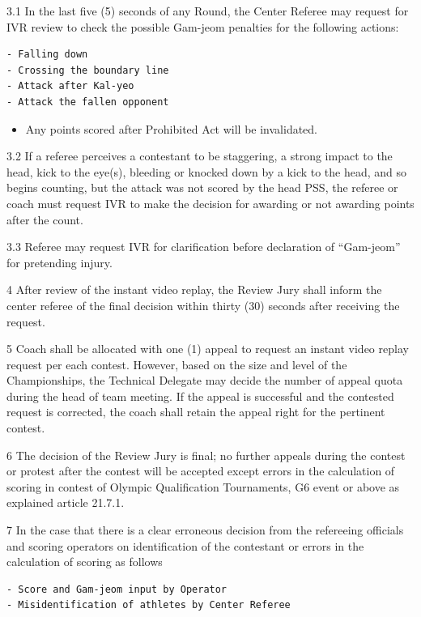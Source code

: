 \documentclass[
]{report}
\providecommand{\tightlist}{%
  \setlength{\itemsep}{0pt}\setlength{\parskip}{0pt}}
\begin{document}
3.1 In the last five (5) seconds of any Round, the Center Referee may
request for IVR review to check the possible Gam-jeom penalties for the
following actions:

\begin{verbatim}
- Falling down
- Crossing the boundary line
- Attack after Kal-yeo
- Attack the fallen opponent
\end{verbatim}

\begin{itemize}
\tightlist
\item
  Any points scored after Prohibited Act will be invalidated.
\end{itemize}

3.2 If a referee perceives a contestant to be staggering, a strong
impact to the head, kick to the eye(s), bleeding or knocked down by a
kick to the head, and so begins counting, but the attack was not scored
by the head PSS, the referee or coach must request IVR to make the
decision for awarding or not awarding points after the count.

3.3 Referee may request IVR for clarification before declaration of
``Gam-jeom'' for pretending injury.

4 After review of the instant video replay, the Review Jury shall inform
the center referee of the final decision within thirty (30) seconds
after receiving the request.

5 Coach shall be allocated with one (1) appeal to request an instant
video replay request per each contest. However, based on the size and
level of the Championships, the Technical Delegate may decide the number
of appeal quota during the head of team meeting. If the appeal is
successful and the contested request is corrected, the coach shall
retain the appeal right for the pertinent contest.

6 The decision of the Review Jury is final; no further appeals during
the contest or protest after the contest will be accepted except errors
in the calculation of scoring in contest of Olympic Qualification
Tournaments, G6 event or above as explained article 21.7.1.

7 In the case that there is a clear erroneous decision from the
refereeing officials and scoring operators on identification of the
contestant or errors in the calculation of scoring as follows

\begin{verbatim}
- Score and Gam-jeom input by Operator
- Misidentification of athletes by Center Referee
\end{verbatim}
\end{document}
